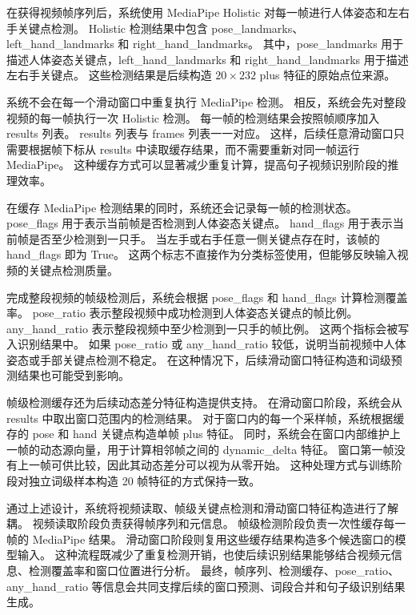 在获得视频帧序列后，系统使用 MediaPipe Holistic 对每一帧进行人体姿态和左右手关键点检测。
Holistic 检测结果中包含 pose\_landmarks、left\_hand\_landmarks 和 right\_hand\_landmarks。
其中，pose\_landmarks 用于描述人体姿态关键点，left\_hand\_landmarks 和 right\_hand\_landmarks 用于描述左右手关键点。
这些检测结果是后续构造 $20\times232$ plus 特征的原始点位来源。

系统不会在每一个滑动窗口中重复执行 MediaPipe 检测。
相反，系统会先对整段视频的每一帧执行一次 Holistic 检测。
每一帧的检测结果会按照帧顺序加入 results 列表。
results 列表与 frames 列表一一对应。
这样，后续任意滑动窗口只需要根据帧下标从 results 中读取缓存结果，而不需要重新对同一帧运行 MediaPipe。
这种缓存方式可以显著减少重复计算，提高句子视频识别阶段的推理效率。

在缓存 MediaPipe 检测结果的同时，系统还会记录每一帧的检测状态。
pose\_flags 用于表示当前帧是否检测到人体姿态关键点。
hand\_flags 用于表示当前帧是否至少检测到一只手。
当左手或右手任意一侧关键点存在时，该帧的 hand\_flags 即为 True。
这两个标志不直接作为分类标签使用，但能够反映输入视频的关键点检测质量。

完成整段视频的帧级检测后，系统会根据 pose\_flags 和 hand\_flags 计算检测覆盖率。
pose\_ratio 表示整段视频中成功检测到人体姿态关键点的帧比例。
any\_hand\_ratio 表示整段视频中至少检测到一只手的帧比例。
这两个指标会被写入识别结果中。
如果 pose\_ratio 或 any\_hand\_ratio 较低，说明当前视频中人体姿态或手部关键点检测不稳定。
在这种情况下，后续滑动窗口特征构造和词级预测结果也可能受到影响。

帧级检测缓存还为后续动态差分特征构造提供支持。
在滑动窗口阶段，系统会从 results 中取出窗口范围内的检测结果。
对于窗口内的每一个采样帧，系统根据缓存的 pose 和 hand 关键点构造单帧 plus 特征。
同时，系统会在窗口内部维护上一帧的动态源向量，用于计算相邻帧之间的 dynamic\_delta 特征。
窗口第一帧没有上一帧可供比较，因此其动态差分可以视为从零开始。
这种处理方式与训练阶段对独立词级样本构造 20 帧特征的方式保持一致。

通过上述设计，系统将视频读取、帧级关键点检测和滑动窗口特征构造进行了解耦。
视频读取阶段负责获得帧序列和元信息。
帧级检测阶段负责一次性缓存每一帧的 MediaPipe 结果。
滑动窗口阶段则复用这些缓存结果构造多个候选窗口的模型输入。
这种流程既减少了重复检测开销，也使后续识别结果能够结合视频元信息、检测覆盖率和窗口位置进行分析。
最终，帧序列、检测缓存、pose\_ratio、any\_hand\_ratio 等信息会共同支撑后续的窗口预测、词段合并和句子级识别结果生成。